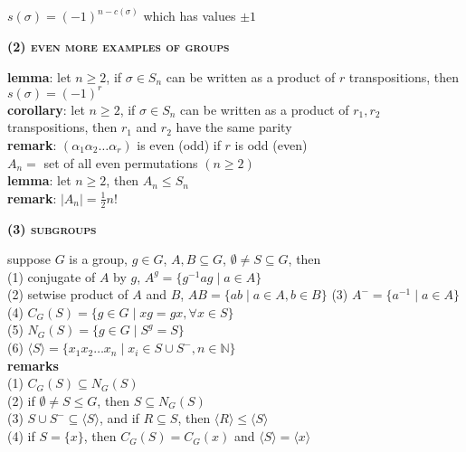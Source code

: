 \documentclass[a4paper]{article}
\newcommand\abs[1]{\ensuremath{\lvert#1\rvert}}
\begin{document}
\begin{multicols}{2}
\begin{framed}
	\noindent
	$s(\sigma) = (-1)^{n - c(\sigma)}$ which has values $\pm 1$
\end{framed}

\begin{framed}
	\begin{center}
		\textbf{\textsc{(2) even more examples of groups}}
	\end{center}

	\noindent
	\textbf{lemma}: let $n \geq 2$, if $\sigma \in S_n$ can be written as a product of $r$ transpositions, then $s(\sigma) = (-1)^r$\\
	
	\noindent
	\textbf{corollary}: let $n \geq 2$, if $\sigma \in S_n$ can be written as a product of $r_1, r_2$ transpositions, then $r_1$ and $r_2$ have the same parity\\
	
	\noindent
	\textbf{remark}: $(\alpha_1\alpha_2\dots\alpha_r)$ is even (odd) if $r$ is odd (even)\\
	
	\noindent
	$A_n = $ set of all even permutations $(n \geq 2)$\\
	
	\noindent
	\textbf{lemma}: let $n \geq 2$, then $A_n \leq S_n$\\
	
	\noindent
	\textbf{remark}: $\abs{A_n} = \frac{1}{2}n!$
\end{framed}


\begin{framed}
	\begin{center}
		\textbf{\textsc{(3) subgroups}}
	\end{center}
	
	\noindent
	suppose $G$ is a group, $g \in G$, $A, B \subseteq G$, $\emptyset \neq S \subseteq G$, then\\
	(1) conjugate of $A$ by $g$, $A^g = \{g^{-1}ag \; \vert \; a \in A\}$\\
	(2) setwise product of $A$ and $B$, $AB = \{ab \; \vert \; a \in A, b \in B\}$
	(3) $A^- = \{a^{-1} \; \vert \; a \in A\}$\\
	(4) $C_G(S) = \{g \in G \; \vert \; xg = gx, \forall x \in S\}$\\
	(5) $N_G(S) = \{g \in G \; \vert \; S^g = S\}$\\
	(6) $\langle S \rangle = \{x_1x_2\dots x_n \; \vert \; x_i \in S \cup S^-, n \in \mathbb{N}\}$\\
	
	\noindent
	\textbf{remarks}\\
	(1) $C_G(S) \subseteq N_G(S)$\\
	(2) if $\emptyset \neq S \leq G$, then $S \subseteq N_G(S)$\\
	(3) $S \cup S^- \subseteq \langle S \rangle$, and if $R \subseteq S$, then $\langle R \rangle \leq \langle S \rangle$\\
	(4) if $S = \{x\}$, then $C_G(S) = C_G(x)$ and $\langle S \rangle = \langle x \rangle$\\
	

\end{framed}
\end{multicols}
\end{document}
